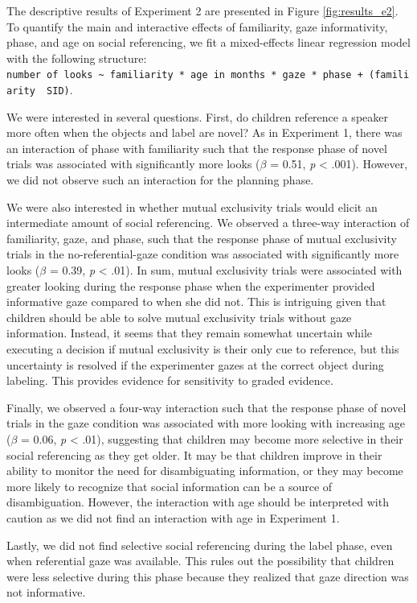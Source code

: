 \documentclass[10pt, letterpaper]{article}
\begin{document}
The descriptive results of Experiment 2 are presented in Figure
\ref{fig:results_e2}. To quantify the main and interactive effects of
familiarity, gaze informativity, phase, and age on social referencing,
we fit a mixed-effects linear regression model with the following
structure:
\texttt{number\ of\ looks\ \textasciitilde{}\ familiarity\ *\ age\ in\ months\ *\ gaze\ *\ phase\ +\ (familiarity\ \textbar{}\ SID)}.

We were interested in several questions. First, do children reference a
speaker more often when the objects and label are novel? As in
Experiment 1, there was an interaction of phase with familiarity such
that the response phase of novel trials was associated with
significantly more looks (\(\beta\) = 0.51, \emph{p} \textless{} .001).
However, we did not observe such an interaction for the planning phase.

We were also interested in whether mutual exclusivity trials would
elicit an intermediate amount of social referencing. We observed a
three-way interaction of familiarity, gaze, and phase, such that the
response phase of mutual exclusivity trials in the no-referential-gaze
condition was associated with significantly more looks (\(\beta\) =
0.39, \emph{p} \textless{} .01). In sum, mutual exclusivity trials were
associated with greater looking during the response phase when the
experimenter provided informative gaze compared to when she did not.
This is intriguing given that children should be able to solve mutual
exclusivity trials without gaze information. Instead, it seems that they
remain somewhat uncertain while executing a decision if mutual
exclusivity is their only cue to reference, but this uncertainty is
resolved if the experimenter gazes at the correct object during
labeling. This provides evidence for sensitivity to graded evidence.

Finally, we observed a four-way interaction such that the response phase
of novel trials in the gaze condition was associated with more looking
with increasing age (\(\beta\) = 0.06, \emph{p} \textless{} .01),
suggesting that children may become more selective in their social
referencing as they get older. It may be that children improve in their
ability to monitor the need for disambiguating information, or they may
become more likely to recognize that social information can be a source
of disambiguation. However, the interaction with age should be
interpreted with caution as we did not find an interaction with age in
Experiment 1.

Lastly, we did not find selective social referencing during the label
phase, even when referential gaze was available. This rules out the
possibility that children were less selective during this phase because
they realized that gaze direction was not informative.
\end{document}
